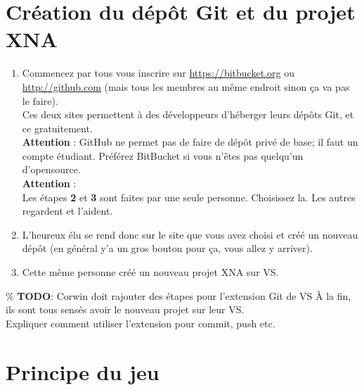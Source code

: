 \documentclass[a4paper]{article}
\begin{document}
\section{Création du dépôt Git et du projet XNA}


\begin{enumerate}
    \item Commencez par tous vous inscrire sur \url{https://bitbucket.org} ou
    \url{http://github.com} (mais tous les membres au même endroit sinon ça va
    pas le faire). \\
    Ces deux sites permettent à des développeurs d'héberger leurs dépôts Git, et ce
    gratuitement.\\
    \textbf{Attention} : GitHub ne permet pas de faire de dépôt privé
    de base; il faut un compte étudiant. Préférez BitBucket si vous n'êtes pas
    quelqu'un d'opensource.\\

    {\color{red} \textbf{Attention} : \\Les étapes \textbf{2} et \textbf{3}
    sont faites par une seule personne. Choisissez la. Les autres regardent et
    l'aident.}\\

    \item L'heureux élu se rend donc sur le site que vous avez choisi et créé un
    nouveau dépôt (en général y'a un gros bouton pour ça, vous allez y arriver). \\

    \item Cette même personne créé un nouveau projet XNA sur VS.
\end{enumerate}

\% \textbf{TODO}: Corwin doit rajouter des étapes pour l'extension Git de VS
À la fin, ils sont tous sensés avoir le nouveau projet sur leur VS. \\
Expliquer comment utiliser l'extension pour commit, push etc.

\section{Principe du jeu}
\end{document}
